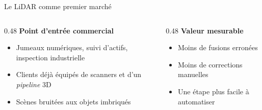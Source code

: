 \documentclass[A4,svgnames,10pt,aspectratio=169,usepdftitle=false]{beamer}
\begin{document}
\begin{frame}{Le LiDAR comme premier marché}
    \begin{columns}[T]
        \begin{column}{0.48\textwidth}
            \textbf{\bleu Point d'entrée commercial}
            \begin{itemize}
                \item Jumeaux numériques, suivi d'actifs, inspection industrielle
                \item Clients déjà équipés de scanners et d'un \emph{pipeline} 3D
                \item Scènes bruitées aux objets imbriqués
            \end{itemize}
        \end{column}
        \begin{column}{0.48\textwidth}
            \textbf{\bleu Valeur mesurable}
            \begin{itemize}
                \item Moins de fusions erronées
                \item Moins de corrections manuelles
                \item Une étape plus facile à automatiser
            \end{itemize}
        \end{column}
    \end{columns}
\end{frame}
\end{document}

